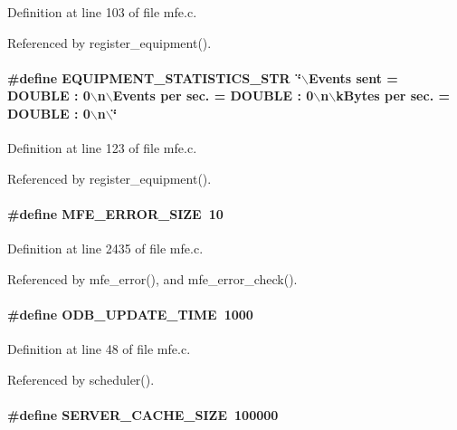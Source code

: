 Definition at line 103 of file mfe.c.

Referenced by register\_\-equipment().
\paragraph[{EQUIPMENT\_\-STATISTICS\_\-STR}]{\setlength{\rightskip}{0pt plus 5cm}\#define EQUIPMENT\_\-STATISTICS\_\-STR~\char`\"{}$\backslash$Events sent = DOUBLE : 0$\backslash$n$\backslash$Events per sec. = DOUBLE : 0$\backslash$n$\backslash$kBytes per sec. = DOUBLE : 0$\backslash$n$\backslash$\char`\"{}}\hfill\label{mfe_8c_a6064db0cc46885d207cedb497e3c355e}


Definition at line 123 of file mfe.c.

Referenced by register\_\-equipment().
\paragraph[{MFE\_\-ERROR\_\-SIZE}]{\setlength{\rightskip}{0pt plus 5cm}\#define MFE\_\-ERROR\_\-SIZE~10}\hfill\label{mfe_8c_af37786539963050729ad8fe0696cb29f}


Definition at line 2435 of file mfe.c.

Referenced by mfe\_\-error(), and mfe\_\-error\_\-check().
\paragraph[{ODB\_\-UPDATE\_\-TIME}]{\setlength{\rightskip}{0pt plus 5cm}\#define ODB\_\-UPDATE\_\-TIME~1000}\hfill\label{mfe_8c_a380a50d445745c2da54a29a1f2e5099e}


Definition at line 48 of file mfe.c.

Referenced by scheduler().
\paragraph[{SERVER\_\-CACHE\_\-SIZE}]{\setlength{\rightskip}{0pt plus 5cm}\#define SERVER\_\-CACHE\_\-SIZE~100000}\hfill\label{mfe_8c_a022c39e327f494dda3664f8888f860f1}



